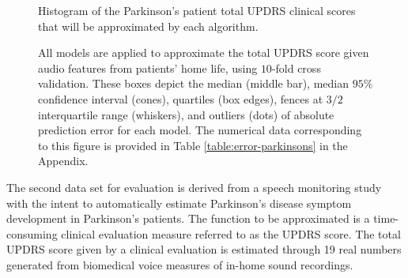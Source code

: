 \documentclass[smallextended,final]{svjour3}  %
\begin{document}
\begin{figure}
  \centering
  \caption{Histogram of the Parkinson's patient total UPDRS clinical
    scores that will be approximated by each algorithm.}
  \label{fig:hist-parkinsons}

  \vspace{.3cm}

  \caption{All models are applied to approximate the total UPDRS score
    given audio features from patients' home life, using $10$-fold
    cross validation. These boxes depict the median (middle bar),
    median $95\%$ confidence interval (cones), quartiles (box edges),
    fences at $3/2$ interquartile range (whiskers), and outliers
    (dots) of absolute prediction error for each model. The numerical
    data corresponding to this figure is provided in Table
    \ref{table:error-parkinsons} in the Appendix.}
  \label{fig:error-parkinsons}
\end{figure}

The second data set for evaluation \cite{tsanas2010accurate} is
derived from a speech monitoring study with the intent to
automatically estimate Parkinson's disease symptom development in
Parkinson's patients. The function to be approximated is a
time-consuming clinical evaluation measure referred to as the UPDRS
score. The total UPDRS score given by a clinical evaluation is
estimated through 19 real numbers generated from biomedical voice
measures of in-home sound recordings.
\end{document}
